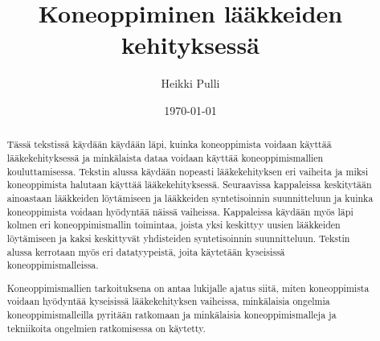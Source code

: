\documentclass[finnish,twoside,censored,tkt,sw-line]{HYthesisML}
\title{Koneoppiminen lääkkeiden kehityksessä}
\author{Heikki Pulli}
\date{\today}
\begin{document}
\maketitle



\begin{abstract}

    Tässä tekstissä käydään käydään läpi, kuinka koneoppimista voidaan käyttää lääkekehityksessä ja minkälaista dataa voidaan käyttää koneoppimismallien kouluttamisessa.
    Tekstin alussa käydään nopeasti lääkekehityksen eri vaiheita ja miksi koneoppimista halutaan käyttää lääkekehityksessä.
    Seuraavissa kappaleissa keskitytään ainoastaan lääkkeiden löytämiseen ja lääkkeiden syntetisoinnin suunnitteluun ja kuinka koneoppimista voidaan hyödyntää näissä vaiheissa.
    Kappaleissa käydään myös läpi kolmen eri koneoppimismallin toimintaa, joista yksi keskittyy uusien lääkkeiden löytämiseen ja kaksi keskittyvät yhdisteiden syntetisoinnin suunnitteluun.
    Tekstin alussa kerrotaan myös eri datatyypeistä, joita käytetään kyseisissä koneoppimismalleissa.

    Koneoppimismallien tarkoituksena on antaa lukijalle ajatus siitä, miten koneoppimista voidaan hyödyntää kyseisissä lääkekehityksen vaiheissa, minkälaisia ongelmia koneoppimismalleilla pyritään ratkomaan ja minkälaisia koneoppimismalleja ja tekniikoita ongelmien ratkomisessa on käytetty.


\end{abstract}


\end{document}
